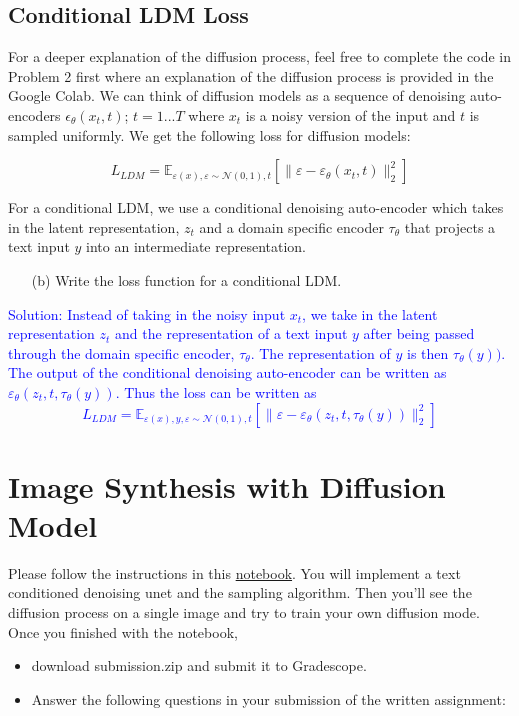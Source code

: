 \documentclass[a4paper]{article}
\begin{document}
\subsection{Conditional LDM Loss}
For a deeper explanation of the diffusion process, feel free to complete the code in Problem 2 first where an explanation of the diffusion process is provided in the Google Colab. We can think of diffusion models as a sequence of denoising auto-encoders \(\epsilon_{\theta}(x_t, t)\); \(t = 1...T\) where \(x_t\) is a noisy version of the input and  \(t\) is sampled uniformly.  We get the following loss for diffusion models:

\[L_{LDM} = \mathbb{E}_{\varepsilon(x), \varepsilon \sim \mathcal{N}(0, 1), t} [\| \varepsilon - \varepsilon_{\theta}(x_t, t) \|_2^2 ] \]

For a conditional LDM, we use a conditional denoising auto-encoder which takes in the latent representation, \(z_t\) and a domain specific encoder \(\tau_{\theta}\) that projects a text input \(y\) into an intermediate representation.  
\begin{itemize}
    \item [(b)]
    Write the loss function for a conditional LDM.
   
\end{itemize}
 \textcolor{blue}{Solution: Instead of taking in the noisy input \(x_t\), we take in the latent representation \(z_t\) and the representation of a text input \(y\) after being passed through the domain specific encoder, \(\tau_{\theta}\). The representation of \(y\) is then \(\tau_{\theta}(y))\).
 The output of the conditional denoising auto-encoder can be written as
 \(\varepsilon_{\theta}(z_t, t, \tau_{\theta}(y))\). Thus the loss can be written as
 \[L_{LDM} = \mathbb{E}_{\varepsilon(x), y, \varepsilon \sim \mathcal{N}(0, 1), t} [\| \varepsilon - \varepsilon_{\theta}(z_t, t, \tau_{\theta}(y)) \|_2^2] \] }

\section{Image Synthesis with Diffusion Model}

Please follow the instructions in this \href{https://colab.research.google.com/drive/1mmyvwlYvAnnfIBIr29bMvOEnL2mUcPHm?usp=sharing}{notebook}. 
You will implement a text conditioned denoising unet and the sampling algorithm. Then you'll see the diffusion process on a single image and try to train your own diffusion mode. Once you finished with the notebook,
\begin{itemize}
    \item download submission.zip and submit it to Gradescope.

    \item Answer the following questions in your submission of the written assignment:
\end{itemize}
\end{document}
